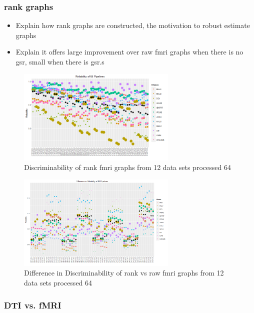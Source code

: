 \documentclass{article}
\begin{document}
\subsubsection{rank graphs}

\begin{itemize}
	\item Explain how rank graphs are constructed, the motivation to robust estimate graphs
	\item Explain it offers large improvement over raw fmri graphs when there is no gsr, small when there is gsr.s
\end{itemize}
\begin{figure}[t!]
	\includegraphics[width=3.0in]{../Figs/64_pipelines_size_rank.png}
	\caption{Discriminability of rank fmri graphs from 12 data sets processed 64}
	\label{fig:8}
\end{figure}


\begin{figure}[t!]
	\includegraphics[width=3.0in]{../Figs/64_pipelines_differ.png}
	\caption{Difference in Discriminability of rank vs raw fmri graphs from 12 data sets processed 64}
	\label{fig:9}
\end{figure}




\subsubsection{DTI vs. fMRI}
\end{document}

